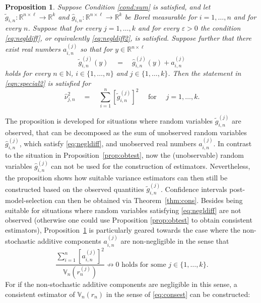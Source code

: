 \documentclass[preprint]{imsart}
\newcommand{\R}{{\mathbb R}}
\newcommand{\N}{{\mathbb N}}
\newtheorem{proposition}[theorem]{Proposition}
\numberwithin{equation}{section}
\begin{document}
\begin{proposition}\label{prop:overest}
Suppose Condition \ref{cond:sum} is satisfied, and let $\tilde{g}_{i,n}: \R^{n \times \ell} \to \R^k$ and $\hat{g}_{i,n}: \R^{n \times \ell} \to \R^k$ be Borel measurable for $i = 1, \hdots, n$ and for every $n$. Suppose that for every $j = 1, \hdots, k$ and for every $\varepsilon > 0$ the condition \eqref{eq:negldiff}, or equivalently \eqref{eq:negldiff2}, is satisfied. Suppose further that there exist real numbers $a_{i,n}^{(j)}$ so that for $y\in\R^{n\times\ell}$
%
\begin{equation*}
\tilde{g}^{(j)}_{i,n}(y) \quad = \quad \hat{g}^{(j)}_{i,n}(y) + a_{i,n}^{(j)}
\end{equation*}
% 
holds for every $n \in \N$, $i \in \{1, \hdots, n\}$ and $j \in \{1, \hdots, k\}$. Then the statement in \eqref{eqn:special2} is satisfied for
%
\begin{equation*}
\hat{\nu}^2_{j,n} \quad = \quad \sum_{i = 1}^n \left[\tilde{g}^{(j)}_{i,n}\right]^2 \quad \text{ for } \quad j = 1, \hdots, k.
\end{equation*}
\end{proposition}
%
The proposition is developed for situations where random variables $\tilde{g}_{i,n}^{(j)}$ are observed, that can be decomposed as the sum of unobserved random variables $\hat{g}_{i,n}^{(j)}$, which satisfy \eqref{eq:negldiff}, and unobserved real numbers $a_{i,n}^{(j)}$. In contrast to the situation in Proposition~\ref{prop:obtest}, now the (unobservable) random variables $\hat{g}_{i,n}^{(j)}$ can not be used for the construction of estimators. Nevertheless, the proposition shows how suitable variance estimators can then still be constructed based on the observed quantities $\tilde{g}_{i,n}^{(j)}$. Confidence intervals post-model-selection can then be obtained via Theorem~\ref{thm:cons}. Besides being suitable for situations where random variables satisfying \eqref{eq:negldiff} are not observed (otherwise one could use Proposition \ref{prop:obtest} to obtain consistent estimators), Proposition~\ref{prop:overest} is particularly geared towards the case where the non-stochastic additive components $a_{i,n}^{(j)}$ are non-negligible in the sense that 
%
\begin{equation*}
\frac{\sum_{i = 1}^n [a_{i,n}^{(j)}]^2}{\mathbb{V}_n(r_n^{(j)})} \not \to 0 \text{ holds for some } j \in \{1, \hdots, k\}.
\end{equation*}
%
For if the non-stochastic additive components are negligible in this sense, a consistent estimator of $\mathbb{V}_n(r_n)$ in the sense of \eqref{eq:consest} can be constructed:
\end{document}
